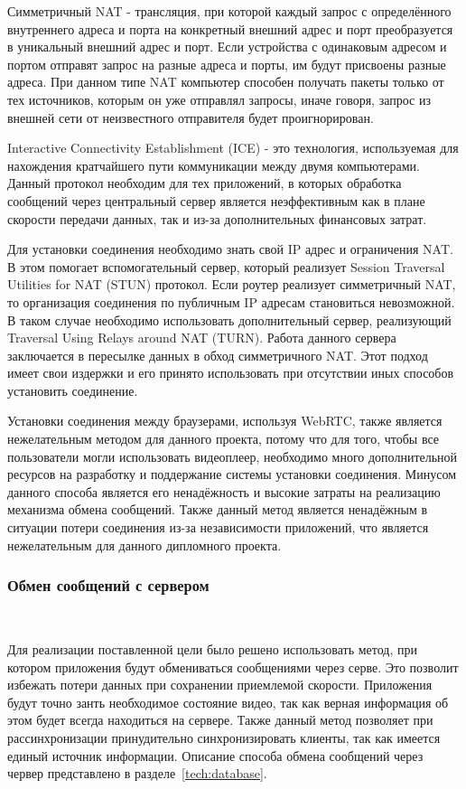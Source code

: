 Симметричный NAT - трансляция, при которой каждый запрос с определённого внутреннего адреса и порта на конкретный внешний адрес и порт преобразуется в уникальный внешний адрес и порт. Если устройства с одинаковым адресом и портом отправят запрос на разные адреса и порты, им будут присвоены разные адреса. При данном типе NAT компьютер способен получать пакеты только от тех источников, которым он уже отправлял запросы, иначе говоря, запрос из внешней сети от неизвестного отправителя будет проигнорирован.
 
Interactive Connectivity Establishment (ICE) - это технология, используемая для нахождения кратчайшего пути коммуникации между двумя компьютерами. Данный протокол необходим для тех приложений, в которых обработка сообщений через центральный сервер является неэффективным как в плане скорости передачи данных, так и из-за дополнительных финансовых затрат.
 
Для установки соединения необходимо знать свой IP адрес и ограничения NAT. В этом помогает вспомогательный сервер, который реализует Session Traversal Utilities for NAT (STUN) протокол. Если роутер реализует симметричный NAT, то организация соединения по публичным IP адресам становиться невозможной. В таком случае необходимо использовать дополнительный сервер, реализующий Traversal Using Relays around NAT (TURN). Работа данного сервера заключается в пересылке данных в обход симметричного NAT. Этот подход имеет свои издержки и его принято использовать при отсутствии иных способов установить соединение.

Установки соединения между браузерами, используя WebRTC, также является нежелательным методом для данного проекта, потому что для того, чтобы все пользователи могли использовать видеоплеер, необходимо много дополнительной ресурсов на разработку и поддержание системы установки соединения. Минусом данного способа является его ненадёжность и высокие затраты на реализацию механизма обмена сообщений. Также данный метод является ненадёжным в ситуации потери соединения из-за независимости приложений, что является нежелательным для данного дипломного проекта. 
 
\subsubsection{Обмен сообщений с сервером}~\par 
Для реализации поставленной цели было решено использовать метод, при котором приложения будут обмениваться сообщениями через серве. Это позволит избежать потери данных при сохранении приемлемой скорости. Приложения будут точно занть необходимое состояние видео, так как верная информация об этом будет всегда находиться на сервере. Также данный метод позволяет при рассинхронизации принудительно синхронизировать клиенты, так как имеется единый источник информации. Описание способа обмена сообщений через червер представлено в разделе~\ref{tech:database}.

